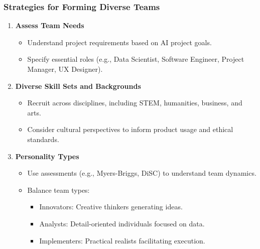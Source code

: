 \documentclass[aspectratio=169]{beamer}
\begin{document}
\begin{frame}[fragile]
    \frametitle{Strategies for Forming Diverse Teams}

    \begin{enumerate}
        \item \textbf{Assess Team Needs}
        \begin{itemize}
            \item Understand project requirements based on AI project goals.
            \item Specify essential roles (e.g., Data Scientist, Software Engineer, Project Manager, UX Designer).
        \end{itemize}

        \item \textbf{Diverse Skill Sets and Backgrounds}
        \begin{itemize}
            \item Recruit across disciplines, including STEM, humanities, business, and arts.
            \item Consider cultural perspectives to inform product usage and ethical standards.
        \end{itemize}

        \item \textbf{Personality Types}
        \begin{itemize}
            \item Use assessments (e.g., Myers-Briggs, DiSC) to understand team dynamics.
            \item Balance team types:
            \begin{itemize}
                \item Innovators: Creative thinkers generating ideas.
                \item Analysts: Detail-oriented individuals focused on data.
                \item Implementers: Practical realists facilitating execution.
            \end{itemize}
        \end{itemize}
    \end{enumerate}
\end{frame}
\end{document}

